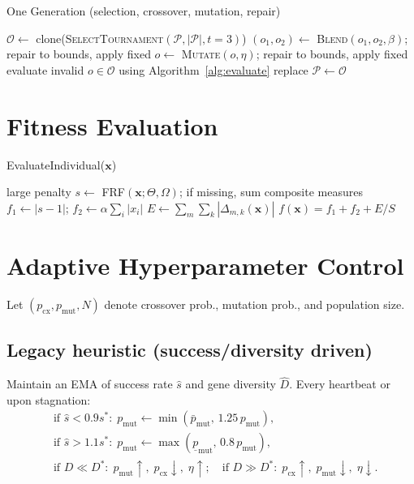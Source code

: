 \documentclass[12pt,a4paper]{article}
\begin{document}
\begin{algorithm}[H]
\caption{One Generation (selection, crossover, mutation, repair)}
\begin{algorithmic}[1]
\State $\mathcal{O} \leftarrow$ clone(\textsc{SelectTournament}$(\mathcal{P},|\mathcal{P}|,t=3)$)
 \State $(o_1,o_2) \leftarrow$ \textsc{Blend}$(o_1,o_2,\beta)$; repair to bounds, apply fixed \EndIf
\EndFor
{}
 \State $o\leftarrow$ \textsc{Mutate}$(o,\eta)$; repair to bounds, apply fixed \EndIf
\EndFor
\State evaluate invalid $o\in\mathcal{O}$ using Algorithm~\ref{alg:evaluate}
\State replace $\mathcal{P}\leftarrow\mathcal{O}$
\end{algorithmic}
\end{algorithm}

\section{Fitness Evaluation}
\begin{algorithm}[H]
\caption{EvaluateIndividual($\bm{x}$)}\label{alg:evaluate}
\begin{algorithmic}[1]
 \State \Return large penalty \EndIf
\State $s \leftarrow$ \textsc{FRF}$(\bm{x};\Theta,\Omega)$; if missing, sum composite measures
\State $f_1\leftarrow |s-1|$; $f_2\leftarrow \alpha\sum_i |x_i|$
\State $E\leftarrow \sum_{m}\sum_{k} |\Delta_{m,k}(\bm{x})|$
\State \Return $f(\bm{x}) = f_1 + f_2 + E/S$
\end{algorithmic}
\end{algorithm}

\section{Adaptive Hyperparameter Control}
Let $(p_{\text{cx}},p_{\text{mut}},N)$ denote crossover prob., mutation prob., and population size.

\subsection{Legacy heuristic (success/diversity driven)}
Maintain an EMA of success rate $\hat{s}$ and gene diversity $\hat{D}$. Every heartbeat or upon stagnation:
\begin{align*}
&\text{if } \hat{s} < 0.9 s^*:\; p_{\text{mut}} \leftarrow \min(\bar{p}_{\text{mut}},\, 1.25\, p_{\text{mut}}),\\
&\text{if } \hat{s} > 1.1 s^*:\; p_{\text{mut}} \leftarrow \max(\underline{p}_{\text{mut}},\, 0.8\, p_{\text{mut}}),\\
&\text{if } D \ll D^*:\; p_{\text{mut}}\uparrow,\; p_{\text{cx}}\downarrow,\; \eta\uparrow;\quad \text{if } D \gg D^*:\; p_{\text{cx}}\uparrow,\; p_{\text{mut}}\downarrow,\; \eta\downarrow.
\end{align*}
\end{document}
